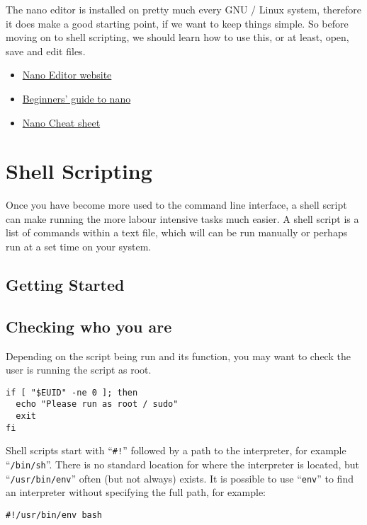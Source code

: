\documentclass{extbook}
\newcommand\youtube[2]{\href{https://invidious.snopyta.org/watch?v=#1}{#2}}
\begin{document}
The nano editor is installed on pretty much every GNU / Linux system, therefore it does make a good starting point, if we want to keep things simple. So before moving on to shell scripting, we should learn how to use this, or at least, open, save and edit files.

\begin{itemize}
\item \href{https://www.nano-editor.org/}{Nano Editor website}
\item \youtube{cLyUZAabf40}{Beginners' guide to nano}
\item \href{https://www.nano-editor.org/dist/latest/cheatsheet.html}{Nano Cheat sheet}

\end{itemize}

\section{Shell Scripting}

Once you have become more used to the command line interface, a shell script can make running the more labour intensive tasks much easier. A shell script is a list of commands within a text file, which will can be run manually or perhaps run at a set time on your system.

\subsection{Getting Started}


\subsection{Checking who you are}

Depending on the script being run and its function, you may want to check the user is running the script as root.

\begin{verbatim}
if [ "$EUID" -ne 0 ]; then
  echo "Please run as root / sudo"
  exit
fi
\end{verbatim}

Shell scripts start with ``\verb|#!|'' followed by a path to the interpreter, for example ``\verb|/bin/sh|''.
There is no standard location for where the interpreter is located, but ``\verb|/usr/bin/env|'' often (but not always) exists.
It is possible to use ``\verb|env|'' to find an interpreter without specifying the full path, for example:

\begin{verbatim}
#!/usr/bin/env bash
\end{verbatim}
\end{document}

